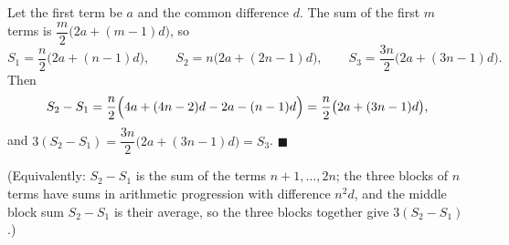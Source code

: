 Let the first term be $a$ and the common difference $d$. The sum of the first $m$ terms is $\dfrac {m}{2}\bigl(2a+(m-1)d\bigr)$, so
\[
S_1=\dfrac {n}{2}\bigl(2a+(n-1)d\bigr),\qquad S_2=n\bigl(2a+(2n-1)d\bigr),\qquad S_3=\dfrac{3n}{2}\bigl(2a+(3n-1)d\bigr).
\]
Then
\[
S_2-S_1=\dfrac {n}{2}\Bigl(4a+(4n-2)d-2a-(n-1)d\Bigr)=\dfrac {n}{2}\bigl(2a+(3n-1)d\bigr),
\]
and $3(S_2-S_1)=\dfrac{3n}{2}\bigl(2a+(3n-1)d\bigr)=S_3$. $\blacksquare$

(Equivalently: $S_2-S_1$ is the sum of the terms $n+1,\dots,2n$; the three blocks of $n$ terms have sums in arithmetic progression with difference $n^2d$, and the middle block sum $S_2-S_1$ is their average, so the three blocks together give $3(S_2-S_1)$.)
